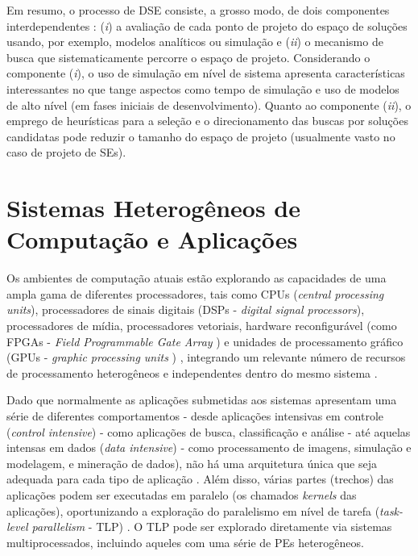 \documentclass[tese-proposta,nocipinfo]{texufpel}
\begin{document}
Em resumo, o processo de DSE consiste, a grosso modo, de dois componentes interdependentes \cite{gries2004methods}: (\textit{i}) a avaliação de cada ponto de projeto do espaço de soluções usando, por exemplo, modelos analíticos ou simulação e (\textit{ii}) o mecanismo de busca que sistematicamente percorre o espaço de projeto. Considerando o componente (\textit{i}), o uso de simulação em nível de sistema apresenta características interessantes no que tange aspectos como tempo de simulação e uso de modelos de alto nível (em fases iniciais de desenvolvimento). Quanto ao componente (\textit{ii}), o emprego de heurísticas para a seleção e o direcionamento das buscas por soluções candidatas pode reduzir o tamanho do espaço de projeto (usualmente vasto no caso de projeto de SEs).  


\section{Sistemas Heterogêneos de Computação e Aplicações}
Os ambientes de computação atuais estão explorando as capacidades de uma ampla gama de diferentes processadores, tais como CPUs (\textit{central processing units}), processadores de sinais digitais (DSPs - \textit{digital signal processors}), processadores de mídia, processadores vetoriais, hardware reconfigurável (como FPGAs - \textit{Field Programmable Gate Array }) e unidades de processamento gráfico (GPUs - \textit{graphic processing units }) \cite{gaster2012heterogeneous,waidyasooriya2018design}, integrando um relevante número de recursos de processamento heterogêneos e independentes dentro do mesmo sistema \cite{miele2015system}. 

Dado que normalmente as aplicações submetidas aos sistemas apresentam uma série de diferentes comportamentos - desde aplicações intensivas em controle (\textit{control intensive}) - como aplicações de busca, classificação e análise - até aquelas intensas em dados (\textit{data intensive}) - como processamento de imagens, simulação e modelagem, e mineração de dados), não há uma arquitetura única que seja adequada para cada tipo de aplicação \cite{gaster2012heterogeneous}. Além disso, várias partes (trechos) das aplicações podem ser executadas em paralelo (os chamados \textit{kernels} das aplicações), oportunizando a exploração do paralelismo em nível de tarefa (\textit{task-level parallelism} - TLP) \cite{scarpazza2006software}. O TLP pode ser explorado diretamente via sistemas multiprocessados, incluindo aqueles com uma série de PEs heterogêneos.
\end{document}
